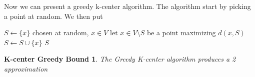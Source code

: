 \documentclass[]{article}
\begin{document}
Now we can present a greedy k-center algorithm. The algorithm start by picking a point at random. We then put 
\begin{algorithm}[H]
	\caption{Greedy-K-center( metric: (V,d), integer: k)}
	\label{alg:k-center}
	\begin{algorithmic}
		\STATE $S \leftarrow \{x\}$ chosen at random, $ x \in V $
		\STATE let $ x \in V\setminus S $ be a point maximizing $ d(x, S) $
		\STATE $ S \leftarrow S \cup \{x\} $
		\ENDWHILE
		\RETURN $ S $
	\end{algorithmic}
\end{algorithm}

\newtheorem{kgreedybound}{K-center Greedy Bound}
\begin{kgreedybound}
	The Greedy K-center algorithm produces a 2 approximation
\end{kgreedybound}
\end{document}
